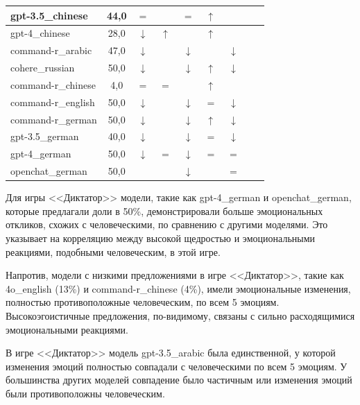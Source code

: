 \begin{longtable}[c]{|p{3.2cm}|c|c|c|c|c|c|c|c|}
\hline
gpt-3.5\_chinese & 44,0 & $=$ & \bluearrow{$\downarrow$} & $=$ & $\uparrow$ & \bluearrow{$\uparrow $}\\
\hline
gpt-4\_chinese & 28,0 & $\downarrow$ & $\uparrow$ & \bluearrow{$\uparrow$} & $\uparrow$ & \bluearrow{$\uparrow $}\\
\hline
command-r\_arabic & 47,0 & $\downarrow$ & \bluearrow{$\downarrow$} & $\downarrow$ & \bluearrow{$\downarrow$} & $\downarrow $\\
\hline
cohere\_russian & 50,0 & $\downarrow$ & \bluearrow{$\downarrow$} & $\downarrow$ & $\uparrow$ & $\downarrow $\\
\hline
command-r\_chinese & 4,0 & $=$ & $=$ & \bluearrow{$\uparrow$} & $\uparrow$ & \bluearrow{$\uparrow $}\\
\hline
command-r\_english & 50,0 & $\downarrow$ & \bluearrow{$\downarrow$} & $\downarrow$ & $=$ & $\downarrow $\\
\hline
command-r\_german & 50,0 & $\downarrow$ & \bluearrow{$\downarrow$} & $\downarrow$ & $\uparrow$ & $\downarrow $\\
\hline
gpt-3.5\_german & 40,0 & $\downarrow$ & \bluearrow{$\downarrow$} & $\downarrow$ & $=$ & $\downarrow $\\
\hline
gpt-4\_german & 50,0 & $\downarrow$ & $=$ & $\downarrow$ & $=$ & $= $\\
\hline
openchat\_ger\-man & 50,0 & \bluearrow{$\uparrow$} & \bluearrow{$\downarrow$} & $\downarrow$ & \bluearrow{$\downarrow$} & $= $\\
         \hline
\end{longtable}


Для игры <<Диктатор>> модели, такие как gpt-4\_german и openchat\_german, которые предлагали доли в 50\%, демонстрировали больше эмоциональных откликов, схожих с человеческими, по сравнению с другими моделями. Это указывает на корреляцию между высокой щедростью и эмоциональными реакциями, подобными человеческим, в этой игре.

Напротив, модели с низкими предложениями в игре <<Диктатор>>, такие как 4o\_english (13\%) и command-r\_chinese (4\%), имели эмоциональные изменения, полностью противоположные человеческим, по всем 5 эмоциям. Высокоэгоистичные предложения, по-видимому, связаны с сильно расходящимися эмоциональными реакциями.

В игре <<Диктатор>> модель gpt-3.5\_arabic была единственной, у которой изменения эмоций полностью совпадали с человеческими по всем 5 эмоциям. У большинства других моделей совпадение было частичным или изменения эмоций были противоположны человеческим.


